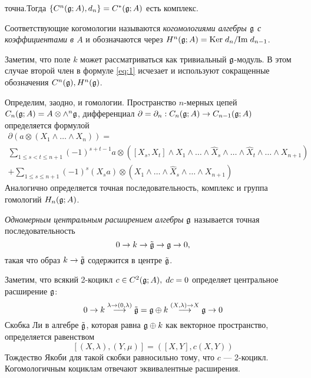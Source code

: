 точна.Тогда $\{C^{n}(\mathfrak{g};A),d_{n}\}=C^{*}(\mathfrak{g};A)$ есть комплекс.
\begin{definition}
Соответствующие когомологии называются {\it когомологиями алгебры $\mathfrak{g}$ с коэффициентами в $A$} и обозначаются через $H^{n}(\mathfrak{g};A)=\mathrm{Ker}\; d_{n}/\mathrm{Im}\; d_{n-1}$. 
  
\end{definition}
Заметим, что поле $k$ может рассматриваться как тривиальный $\mathfrak{g}$-модуль. В этом случае второй член в формуле \eqref{eq:1} исчезает и используют сокращенные обозначения $C^{n}(\mathfrak{g}), H^{n}(\mathfrak{g})$.
\begin{definition}
  Определим, заодно, и гомологии. Пространство $n$-мерных цепей $C_{n}(\mathfrak{g};A)=A\otimes \wedge^{n}\mathfrak{g}$, дифференциал $\partial=\partial_{n}:C_{n}(\mathfrak{g};A)\to C_{n-1}(\mathfrak{g};A)$ определяется формулой
  \begin{multline}
    \label{eq:98}
    \partial(a\otimes (X_{1}\wedge \dots \wedge X_{n})) =\\ \sum_{1\leq s<t\leq n+1} (-1)^{s+t-1} a\otimes ([X_{s},X_{t}]\wedge X_{1} \wedge\dots\wedge\hat X_{s}\wedge \dots\wedge \hat X_{t}\wedge \dots\wedge X_{n+1})\\
    +\sum_{1\leq s\leq n+1} (-1)^{s}(X_{s} a)\otimes (X_{1}\wedge\dots\wedge \hat X_{s}\wedge\dots\wedge X_{n+1})
  \end{multline}
  Аналогично определяется точная последовательность, комплекс и группа гомологий $H_{n}(\mathfrak{g};A)$.
\end{definition}
\begin{definition}
  {\it Одномерным центральным расширением алгебры $\mathfrak{g}$ } называется точная последовательность
  \begin{equation}
    \label{eq:62}
    0\to k \to \tilde {\mathfrak{g}}\to \mathfrak{g}\to 0,
  \end{equation}
  такая что образ $k\to \tilde{\mathfrak{g}}$ содержится в центре $\tilde{\mathfrak{g}}$.
\end{definition}
Заметим, что всякий 2-коцикл $c\in C^{2}(\mathfrak{g};A), \; dc=0$ определяет центральное расширение $\mathfrak{g}$:
\begin{equation}
  \label{eq:64}
  0\to k\stackrel{\lambda\to (0,\lambda)}{\longrightarrow}\tilde{\mathfrak{g}}=\mathfrak{g}\oplus k \stackrel{(X,\lambda)\to X}{\longrightarrow} \mathfrak{g}\to 0
\end{equation}
Скобка Ли в алгебре $\tilde{\mathfrak{g}}$, которая равна $\mathfrak{g}\oplus k$ как векторное пространство, определяется равенством
\begin{equation}
  \label{eq:103}
  [(X,\lambda),(Y,\mu)]=([X,Y],c(X,Y))
\end{equation}
Тождество Якоби для такой скобки равносильно тому, что $c$\; --- 2-коцикл. Когомологичным коциклам отвечают эквивалентные расширения. 

